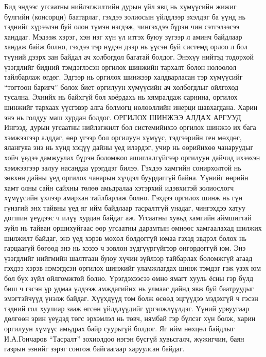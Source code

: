 Бид эндээс угсаатны нийлэгжилтийн дурын үйл явц нь хүмүүсийн жижиг бүлгийн (консорци) баатарлаг, гэхдээ золиосын үйлдлээр эхэлдэг ба үүнд нь тэднийг хүрээлэн буй олон түмэн нэгдэж, чингэхдээ бүрэн чин сэтгэлээсээ ханддаг. Мэдээж хэрэг, хэн нэг хүн үл итгэх буюу зүгээр л аминч байдлаар хандаж байж болно, гэхдээ тэр нүдэн дээр нь үүсэн буй системд орлоо л бол түүний дээрх зан байдал ач холбогдол багатай болдог. Энэхүү нийтэд тодорхой үзэгдлийг бидний тэмдэглэсэн оргилох шинжийн тархалт болон нөлөөлөл тайлбарлаж өгдөг. Эдгээр нь оргилох шинжээр халдварласан тэр хүмүүсийг “тогтоон баригч” болох биет оргилуун хүмүүсийн ач холбогдлыг ойлгоход тусална. Эхнийх нь байхгүй бол хоёрдахь нь хямралдаж сарнина, оргилох шинжийг тархаах үүсгэвэр алга болмогц нөлөөллийн инерци шавхагдана. Харин энэ нь голдуу маш хурдан болдог.
ОРГИЛОХ ШИНЖЭЭ АЛДАХ АРГУУД
Ингээд, дурын угсаатны нийлэгжилт бол системийнхээ оргилох шинжээ их бага хэмжээгээр алддаг, өөр үгээр бол оргилуун хүмүүс, тэдгээрийн ген мөхдөг, ялангуяа энэ нь хүнд хэцүү дайны үед илэрдэг, учир нь өөрийнхөө чанаруудыг хойч үедээ дамжуулах бүрэн боломжоо ашиглалгүйгээр оргилуун дайчид ихээхэн хэмжээгээр залуу насандаа үрэгддэг билээ.
Гэхдээ хамгийн сонирхолтой нь зөвхөн дайны үед оргилох чанарын хүчдэл буурдаггүй байна. Үүнийг өөрийн хамт олны сайн сайхны төлөө амьдралаа хэтэрхий идэвхитэй золиослогч хүмүүсийн үхлээр амархан тайлбарлаж болно. Гэхдээ оргилох шинж нь гүн гүнзгий энх тайвны үед яг ийм байдлаар тасралтгүй унадаг, чингэхдээ хатуу догшин үеүдээс ч илүү хурдан байдаг аж. Угсаатны хувьд хамгийн аймшигтай зүйл нь тайван оршихуйгаас өөр угсаатны дарамтын өмнөөс хамгаалахад шилжих шилжилт байдаг, энэ үед хэрэв мөхөл болдоггүй юмаа гэхэд эвдрэл болох нь гарцаагүй бөгөөд энэ нь хэзээ ч зовлон зүдгүүргүйгээр өнгөрдөггүй юм. Энэ үзэгдлийг нийгмийн шалтгаан буюу хүчин зүйлээр тайбарлах боломжгүй агаад гэхдээ хэрэв нэмэгдсэн оргилох шинжийг уламжлагдах шинж тэмдэг гэж үзэх юм бол бүх зүйл ойлгомжтой болно.
Үрэгдэхээсээ өмнө ямагт хууль ёсны гэр бүлд биш ч гэсэн үр удмаа үлдээж амждагийнх нь улмаас дайнд явж буй баатруудыг эмэгтэйчүүд үнэлж байдаг. Хүүхдүүд том болж өсөөд эцгүүдээ мэдэхгүй ч гэсэн тэдний гол хуулиар зааж өгсөн үйлдлүүдийг үргэлжлүүлдэг. Үүний урвуугаар дөлгөөн эрин үеүдэд төгс эрхэмлэл нь төвч, нямбай гэр бүлсэг хүн болж, харин оргилуун хүмүүс амьдрах байр суурьгүй болдог. Яг ийм нөхцөл байдлыг И.А.Гончаров “Тасралт” зохиолдоо нэгэн бүсгүй хувьсгалч, жүжигчин, баян газрын эзнийг зэрэг сонгож байгаагаар харуулсан байдаг.

